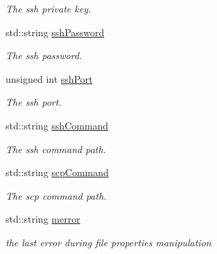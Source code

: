 \begin{DoxyCompactItemize}
\begin{DoxyCompactList}\small\item\em The ssh private key. \item\end{DoxyCompactList}\item 
\hypertarget{classSSHFile_a824e84e8d2ddfe669b6d824f06527c44}{
std::string \hyperlink{classSSHFile_a824e84e8d2ddfe669b6d824f06527c44}{sshPassword}}
\label{classSSHFile_a824e84e8d2ddfe669b6d824f06527c44}

\begin{DoxyCompactList}\small\item\em The ssh password. \item\end{DoxyCompactList}\item 
\hypertarget{classSSHFile_affe979a9a81151e5094608ca9553745d}{
unsigned int \hyperlink{classSSHFile_affe979a9a81151e5094608ca9553745d}{sshPort}}
\label{classSSHFile_affe979a9a81151e5094608ca9553745d}

\begin{DoxyCompactList}\small\item\em The ssh port. \item\end{DoxyCompactList}\item 
\hypertarget{classSSHFile_a4c78048685325e41ae6ca61ab7c5cdc4}{
std::string \hyperlink{classSSHFile_a4c78048685325e41ae6ca61ab7c5cdc4}{sshCommand}}
\label{classSSHFile_a4c78048685325e41ae6ca61ab7c5cdc4}

\begin{DoxyCompactList}\small\item\em The ssh command path. \item\end{DoxyCompactList}\item 
\hypertarget{classSSHFile_a7ae092c6888e1e256346e393f7ac075e}{
std::string \hyperlink{classSSHFile_a7ae092c6888e1e256346e393f7ac075e}{scpCommand}}
\label{classSSHFile_a7ae092c6888e1e256346e393f7ac075e}

\begin{DoxyCompactList}\small\item\em The scp command path. \item\end{DoxyCompactList}\item 
\hypertarget{classSSHFile_a6d993e63fef1f7dc9ef1f9136a0c868e}{
std::string \hyperlink{classSSHFile_a6d993e63fef1f7dc9ef1f9136a0c868e}{merror}}
\label{classSSHFile_a6d993e63fef1f7dc9ef1f9136a0c868e}

\begin{DoxyCompactList}\small\item\em the last error during file properties manipulation \item\end{DoxyCompactList}\end{DoxyCompactItemize}


